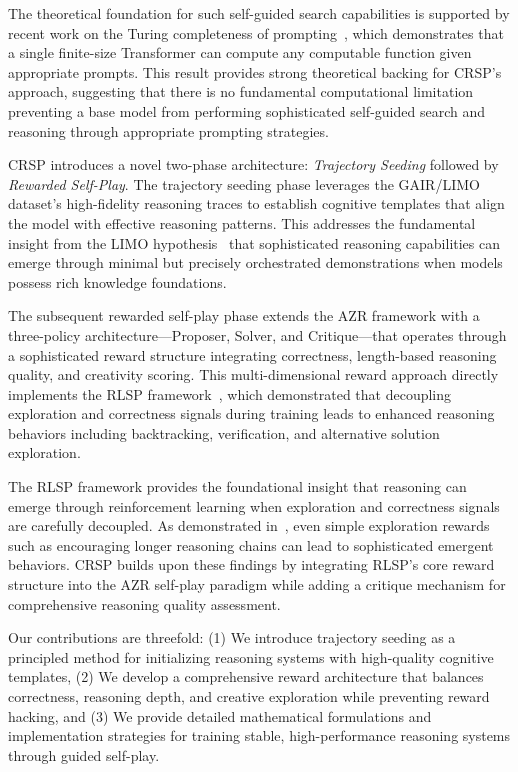 \documentclass[10pt,a4paper]{article}
\begin{document}
The theoretical foundation for such self-guided search capabilities is supported by recent work on the Turing completeness of prompting~\cite{qiu2024turing}, which demonstrates that a single finite-size Transformer can compute any computable function given appropriate prompts. This result provides strong theoretical backing for CRSP's approach, suggesting that there is no fundamental computational limitation preventing a base model from performing sophisticated self-guided search and reasoning through appropriate prompting strategies.

CRSP introduces a novel two-phase architecture: \textit{Trajectory Seeding} followed by \textit{Rewarded Self-Play}. The trajectory seeding phase leverages the GAIR/LIMO dataset's high-fidelity reasoning traces to establish cognitive templates that align the model with effective reasoning patterns. This addresses the fundamental insight from the LIMO hypothesis~\cite{ye2025limo} that sophisticated reasoning capabilities can emerge through minimal but precisely orchestrated demonstrations when models possess rich knowledge foundations.

The subsequent rewarded self-play phase extends the AZR framework with a three-policy architecture—Proposer, Solver, and Critique—that operates through a sophisticated reward structure integrating correctness, length-based reasoning quality, and creativity scoring. This multi-dimensional reward approach directly implements the RLSP framework~\cite{ye2025emergence}, which demonstrated that decoupling exploration and correctness signals during training leads to enhanced reasoning behaviors including backtracking, verification, and alternative solution exploration.

The RLSP framework provides the foundational insight that reasoning can emerge through reinforcement learning when exploration and correctness signals are carefully decoupled. As demonstrated in~\cite{ye2025emergence}, even simple exploration rewards such as encouraging longer reasoning chains can lead to sophisticated emergent behaviors. CRSP builds upon these findings by integrating RLSP's core reward structure into the AZR self-play paradigm while adding a critique mechanism for comprehensive reasoning quality assessment.

Our contributions are threefold: (1) We introduce trajectory seeding as a principled method for initializing reasoning systems with high-quality cognitive templates, (2) We develop a comprehensive reward architecture that balances correctness, reasoning depth, and creative exploration while preventing reward hacking, and (3) We provide detailed mathematical formulations and implementation strategies for training stable, high-performance reasoning systems through guided self-play.
\end{document}
